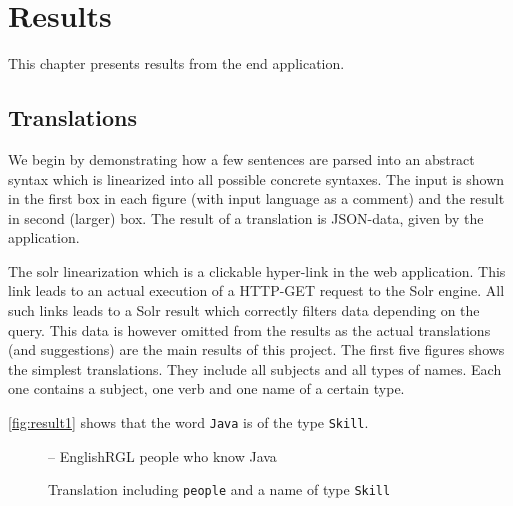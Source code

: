 \chapter{Results}\label{ch:results}
This chapter presents results from the end application.

\section{Translations}
We begin by demonstrating how a few sentences are parsed into an abstract syntax which is linearized into all possible concrete syntaxes. The input is shown in the first box in each figure (with input language as a comment) and the result in second (larger) box. The result of a translation is JSON-data, given by the application.

The solr linearization which is a clickable hyper-link in the web application. This link leads to an actual execution of a HTTP-GET request to the Solr engine. All such links leads to a Solr result which correctly filters data depending on the query. This data is however omitted from the results as the actual translations (and suggestions) are the main results of this project.
\newline
\newline
The first five figures shows the simplest translations. They include all subjects and all types of names. Each one contains a subject, one verb and one name of a certain type.
\newline
\newline

\autoref{fig:result1} shows that the word \texttt{Java} is of the type \texttt{Skill}.

\begin{figure}[H]
\begin{terminal}
-- EnglishRGL
people who know Java
\end{terminal}
\begin{json-small}
\end{json-small}
\caption{Translation including \texttt{people} and a name of type \texttt{Skill}\label{fig:result1}}
\end{figure}

